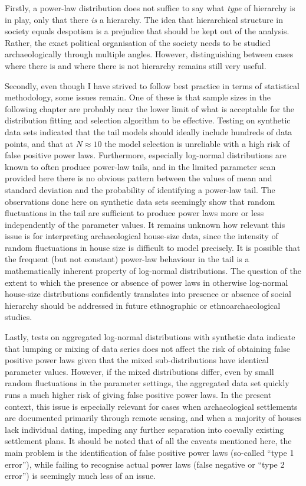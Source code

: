 \documentclass[
  12pt,
  a4paper, twoside]{book}
\begin{document}
Firstly, a power-law distribution does not suffice to say what \emph{type} of hierarchy is in play, only that there \emph{is} a hierarchy. The idea that hierarchical structure in society equals despotism is a prejudice that should be kept out of the analysis. Rather, the exact political organisation of the society needs to be studied archaeologically through multiple angles. However, distinguishing between cases where there is and where there is not hierarchy remains still very useful.

Secondly, even though I have strived to follow best practice in terms of statistical methodology, some issues remain. One of these is that sample sizes in the following chapter are probably near the lower limit of what is acceptable for the distribution fitting and selection algorithm to be effective. Testing on synthetic data sets indicated that the tail models should ideally include hundreds of data points, and that at \(N \approx 10\) the model selection is unreliable with a high risk of false positive power laws. Furthermore, especially log-normal distributions are known to often produce power-law tails, and in the limited parameter scan provided here there is no obvious pattern between the values of mean and standard deviation and the probability of identifying a power-law tail. The observations done here on synthetic data sets seemingly show that random fluctuations in the tail are sufficient to produce power laws more or less independently of the parameter values. It remains unknown how relevant this issue is for interpreting archaeological house-size data, since the intensity of random fluctuations in house size is difficult to model precisely. It is possible that the frequent (but not constant) power-law behaviour in the tail is a mathematically inherent property of log-normal distributions. The question of the extent to which the presence or absence of power laws in otherwise log-normal house-size distributions confidently translates into presence or absence of social hierarchy should be addressed in future ethnographic or ethnoarchaeological studies.

Lastly, tests on aggregated log-normal distributions with synthetic data indicate that lumping or mixing of data series does not affect the risk of obtaining false positive power laws given that the mixed sub-distributions have identical parameter values. However, if the mixed distributions differ, even by small random fluctuations in the parameter settings, the aggregated data set quickly runs a much higher risk of giving false positive power laws. In the present context, this issue is especially relevant for cases when archaeological settlements are documented primarily through remote sensing, and when a majority of houses lack individual dating, impeding any further separation into coevally existing settlement plans. It should be noted that of all the caveats mentioned here, the main problem is the identification of false positive power laws (so-called ``type 1 error''), while failing to recognise actual power laws (false negative or ``type 2 error'') is seemingly much less of an issue.
\end{document}
